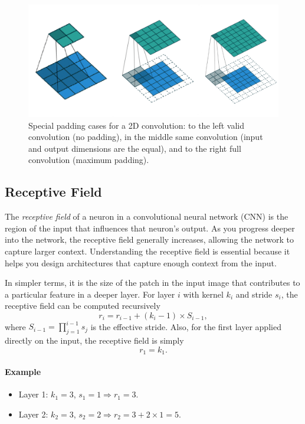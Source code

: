 \documentclass{article}
\begin{document}
\begin{figure}[ht]
    \centering
    \includegraphics[width=0.7\linewidth]{graphics/padding_cnn.png}
    \caption{Special padding cases for a 2D convolution: to the left valid convolution (no padding), in the middle same convolution (input and output dimensions are the equal), and to the right full convolution (maximum padding).}
    \label{fig:padding-cnn}
\end{figure}

\subsection{Receptive Field}

The \emph{receptive field} of a neuron in a convolutional neural network (CNN) is the region of the input that influences that neuron's output. As you progress deeper into the network, the receptive field generally increases, allowing the network to capture larger context. Understanding the receptive field is essential because it helps you design architectures that capture enough context from the input.

In simpler terms, it is the size of the patch in the input image that contributes to a particular feature in a deeper layer. For layer \(i\) with kernel \(k_i\) and stride \(s_i\), the receptive field can be computed recursively
\[
r_i = r_{i-1} + (k_i - 1) \times S_{i-1},
\]
where \(S_{i-1} = \prod_{j=1}^{i-1} s_j\) is the effective stride. Also, for the first layer applied directly on the input, the receptive field is simply
\[
r_1 = k_1.
\]

\paragraph{Example}
\begin{itemize}
    \item Layer 1: \(k_1 = 3\), \(s_1 = 1 \Rightarrow r_1 = 3\).
    \item Layer 2: \(k_2 = 3\), \(s_2 = 2 \Rightarrow r_2 = 3 + 2 \times 1 = 5\).
\end{itemize}
\end{document}
